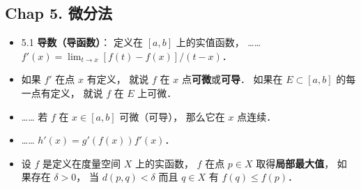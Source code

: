 \subsection{Chap 5. 微分法}
\begin{itemize}
\item 5.1 \textbf{导数（导函数）}： 定义在 $[a,b]$ 上的实值函数， …… $f'(x) = \lim_{t\to x} [f(t)-f(x)]/(t-x)$．

\item 如果 $f'$ 在点 $x$ 有定义， 就说 $f$ 在 $x$ 点\textbf{可微}或\textbf{可导}． 如果在 $E\subset [a,b]$ 的每一点有定义， 就说 $f$ 在 $E$ 上可微．

\item …… 若 $f$ 在 $x\in [a,b]$ 可微（可导）， 那么它在 $x$ 点连续．

\item …… $h'(x) = g'(f(x))f'(x)$．

\item 设 $f$ 是定义在度量空间 $X$ 上的实函数， $f$ 在点 $p\in X$ 取得\textbf{局部最大值}， 如果存在 $\delta>0$， 当 $d(p,q)<\delta$ 而且 $q\in X$ 有 $f(q)\leqslant f(p)$．
\end{itemize}


